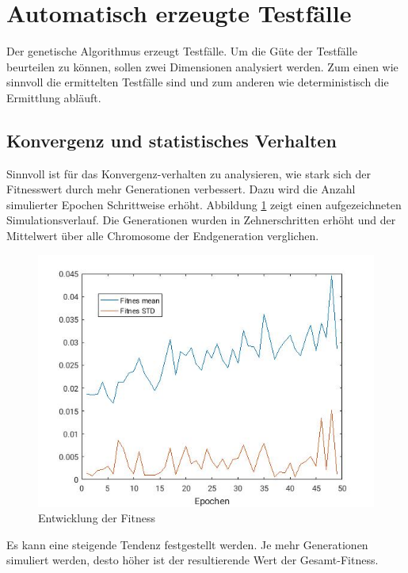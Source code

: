 \documentclass[12pt,a4paper]{article}
\begin{document}
\section{Automatisch erzeugte Testfälle}
Der genetische Algorithmus erzeugt Testfälle. Um die Güte der Testfälle beurteilen zu können, sollen zwei Dimensionen analysiert werden. Zum einen wie sinnvoll die ermittelten Testfälle sind und zum anderen wie deterministisch die Ermittlung abläuft.

\subsection{Konvergenz und statistisches Verhalten}
Sinnvoll ist für das Konvergenz-verhalten zu analysieren, wie stark sich der Fitnesswert durch mehr Generationen verbessert.
Dazu wird die Anzahl simulierter Epochen Schrittweise erhöht. Abbildung \ref{fig:epochen} zeigt einen aufgezeichneten Simulationsverlauf. Die Generationen wurden in Zehnerschritten erhöht und der Mittelwert über alle Chromosome der Endgeneration verglichen.
\begin{figure}\centering
\includegraphics[width=.6\textwidth]{increasedEpochs.jpg}
\caption{Entwicklung der Fitness}
\label{fig:epochen}
\end{figure}
Es kann eine steigende Tendenz festgestellt werden. Je mehr Generationen simuliert werden, desto höher ist der resultierende Wert der Gesamt-Fitness.
\end{document}

